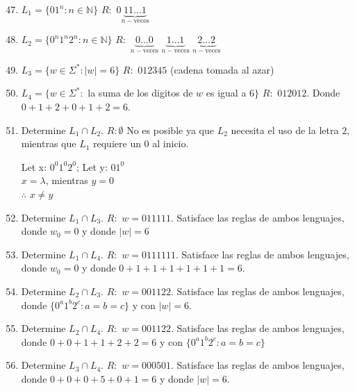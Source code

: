 \begin{enumerate}
    \setcounter{enumi}{46}
    \item $L_1 = \{01^n : n \in \mathbb{N}\}$
        \subitem $R: $ $0\underbrace{11\ldots1}_{n-\text{veces}}$
    \item $L_2 = \{0^n 1^n 2^n : n \in \mathbb{N}\}$
        \subitem $R: $ 
            $\underbrace{0\ldots0}_{n-\text{veces}}$
            $\underbrace{1\ldots1}_{n-\text{veces}}$
            $\underbrace{2\ldots2}_{n-\text{veces}}$
    \item $L_3 = \{w \in \Sigma^* : |w| = 6\}$
        \subitem $R: $ $012345$ (cadena tomada al azar)
    \item $L_4 = \{w \in \Sigma^* :$ la suma de los digitos de $w$ es igual a $6\}$
        \subitem $R: $ $012012$. Donde $0+1+2+0+1+2 = 6$.
    \item Determine $L_1 \cap L_2$.
        \subitem $R: \emptyset$ No es posible ya que $L_2$ necesita el uso de la letra $2$, mientras que $L_1$ requiere un $0$ al inicio.
        
        \begin{center}
            Let x: $0^0 1^0 2^0$; Let y: $01^0$\\
            $x = \lambda$, mientras $y = 0$ \\
            $\therefore$ $x \neq y$
        \end{center}
    \item Determine $L_1 \cap L_3$.
        \subitem $R: $ $w = 011111$. Satisface las reglas de ambos lenguajes, donde $w_0 = 0$ y donde $|w| = 6$
    \item Determine $L_1 \cap L_4$.
        \subitem $R: $ $w = 0111111$. Satisface las reglas de ambos lenguajes, donde $w_0 = 0$ y donde $0+1+1+1+1+1+1 = 6$.
    \item Determine $L_2 \cap L_3$.
        \subitem $R: $ $w = 001122$. Satisface las reglas de ambos lenguajes, donde $\{0^a 1^b 2^c : a = b = c\}$ y con $|w| = 6$.
    \item Determine $L_2 \cap L_4$.
        \subitem $R: $ $w = 001122$. Satisface las reglas de ambos lenguajes, donde $0+0+1+1+2+2 = 6$ y con $\{0^a 1^b 2^c : a = b = c\}$
    \item Determine $L_3 \cap L_4$.
        \subitem $R: $ $w = 000501$. Satisface las reglas de ambos lenguajes, donde $0+0+0+5+0+1 = 6$ y donde $|w| = 6$.
\end{enumerate}